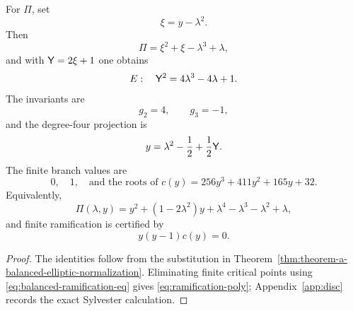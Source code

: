 \begin{proposition}\label{prop:elliptic-reduction}
For $\Pi$, set
\begin{equation}\label{eq:xi-def}
\xi=y-\lambda^2.
\end{equation}
Then
\begin{equation}\label{eq:elliptic-xi}
\Pi=\xi^2+\xi-\lambda^3+\lambda,
\end{equation}
and with $\mathsf{Y}=2\xi+1$ one obtains
\begin{equation}\label{eq:elliptic-weierstrass}
E:\quad \mathsf{Y}^2=4\lambda^3-4\lambda+1.
\end{equation}
The invariants are
\begin{equation}\label{eq:weierstrass-invariants}
g_2=4,\qquad g_3=-1,
\end{equation}
and the degree-four projection is
\begin{equation}\label{eq:y-from-E}
y=\lambda^2-\frac12+\frac12\mathsf{Y}.
\end{equation}
The finite branch values are
\begin{equation}\label{eq:branch-values}
0,
\quad 1,
\quad \text{and the roots of }c(y)=256y^3+411y^2+165y+32.
\end{equation}
\label{eq:branch-value-convention}
Equivalently,
\begin{equation}\label{eq:Pi-as-quadratic-in-y}
\Pi(\lambda,y)=y^2+(1-2\lambda^2)y+\lambda^4-\lambda^3-\lambda^2+\lambda,
\end{equation}
and finite ramification is certified by
\begin{equation}\label{eq:ramification-poly}
y(y-1)c(y)=0.
\end{equation}
\end{proposition}
\begin{proof}
The identities follow from the substitution in Theorem~\ref{thm:theorem-a-balanced-elliptic-normalization}.  Eliminating finite critical points using \eqref{eq:balanced-ramification-eq} gives \eqref{eq:ramification-poly}; Appendix~\ref{app:disc} records the exact Sylvester calculation.
\end{proof}

